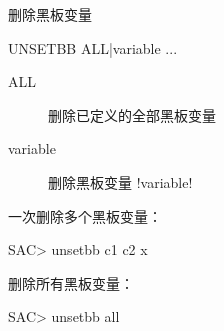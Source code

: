 \label{cmd:unsetbb}

删除黑板变量

\begin{SACSTX}
UNSETBB ALL|variable ...
\end{SACSTX}

\begin{description}
\item [ALL] 删除已定义的全部黑板变量
\item [variable] 删除黑板变量 !variable!
\end{description}

一次删除多个黑板变量：
\begin{SACCode}
SAC> unsetbb c1 c2 x
\end{SACCode}

删除所有黑板变量：
\begin{SACCode}
SAC> unsetbb all
\end{SACCode}
